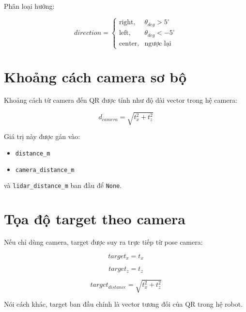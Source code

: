 \documentclass[12pt,a4paper]{article}
\begin{document}
Phân loại hướng:

\begin{equation}
direction =
\begin{cases}
\text{right}, & \theta_{deg} > 5^\circ \\
\text{left}, & \theta_{deg} < -5^\circ \\
\text{center}, & \text{ngược lại}
\end{cases}
\end{equation}

\section{Khoảng cách camera sơ bộ}

Khoảng cách từ camera đến QR được tính như độ dài vector trong hệ camera:

\begin{equation}
d_{camera} = \sqrt{t_x^2 + t_z^2}
\end{equation}

Giá trị này được gán vào:

\begin{itemize}
    \item \texttt{distance\_m}
    \item \texttt{camera\_distance\_m}
\end{itemize}

và \texttt{lidar\_distance\_m} ban đầu để \texttt{None}.

\section{Tọa độ target theo camera}

Nếu chỉ dùng camera, target được suy ra trực tiếp từ pose camera:

\begin{equation}
target_x = t_x
\end{equation}

\begin{equation}
target_z = t_z
\end{equation}

\begin{equation}
target_{distance} = \sqrt{t_x^2 + t_z^2}
\end{equation}

Nói cách khác, target ban đầu chính là vector tương đối của QR trong hệ robot.
\end{document}
